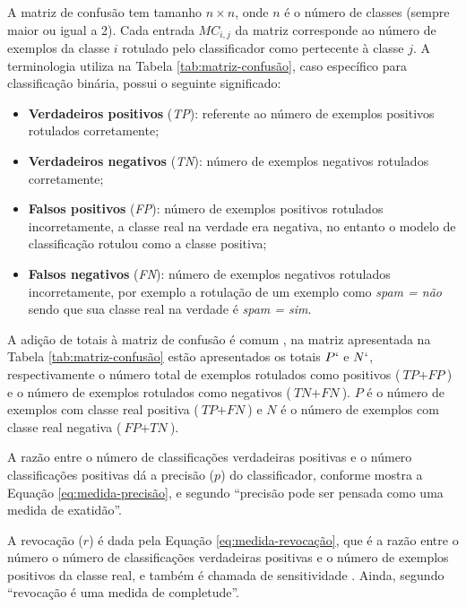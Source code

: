         A matriz de confusão tem tamanho $n \times n$, onde $n$ é o número de classes (sempre maior ou igual a 2).
        Cada entrada ${MC}_{i,j}$ da matriz corresponde ao número de exemplos da classe $i$ rotulado pelo classificador como pertecente à classe $j$.
        A terminologia utiliza na Tabela \ref{tab:matriz-confusão}, caso específico para classificação binária, possui o seguinte significado:
        \begin{itemize}
            \item \textbf{Verdadeiros positivos} (\textit{TP}): referente ao número de exemplos positivos rotulados corretamente;
            
            \item \textbf{Verdadeiros negativos} (\textit{TN}): número de exemplos negativos rotulados corretamente;
            
            \item \textbf{Falsos positivos} (\textit{FP}): número de exemplos positivos rotulados incorretamente, a classe real na verdade era negativa, no entanto o modelo de classificação rotulou como a classe positiva;
            
            \item \textbf{Falsos negativos} (\textit{FN}): número de exemplos negativos rotulados incorretamente, por exemplo a rotulação de um exemplo como \textit{spam = não} sendo que sua classe real na verdade é \textit{spam = sim}.
        \end{itemize}
        A adição de totais à matriz de confusão é comum \cite[p.~366]{Han:2011:DMC:1972541}, na matriz apresentada na Tabela \ref{tab:matriz-confusão} estão apresentados os totais $P`$ e $N`$, respectivamente o número total de exemplos rotulados como positivos ($\textit{TP} + \textit{FP}$) e o número de exemplos rotulados como negativos ($\textit{TN} + \textit{FN}$).
        $P$ é o número de exemplos com classe real positiva ($\textit{TP} + \textit{FN}$) e $N$ é o número de exemplos com classe real negativa ($\textit{FP} + \textit{TN}$).
        
        A razão entre o número de classificações verdadeiras positivas e o número classificações positivas dá a precisão ($p$) do classificador, conforme mostra a Equação \ref{eq:medida-precisão}, e segundo  ``precisão pode ser pensada como uma medida de exatidão''.
        
        A revocação ($r$) é dada pela Equação \ref{eq:medida-revocação}, que é a razão entre o número o número de classificações verdadeiras positivas e o número de exemplos positivos da classe real, e também é chamada de sensitividade \cite[p.~364--365]{Han:2011:DMC:1972541}.
        Ainda, segundo   ``revocação é uma medida de completude''.
        
